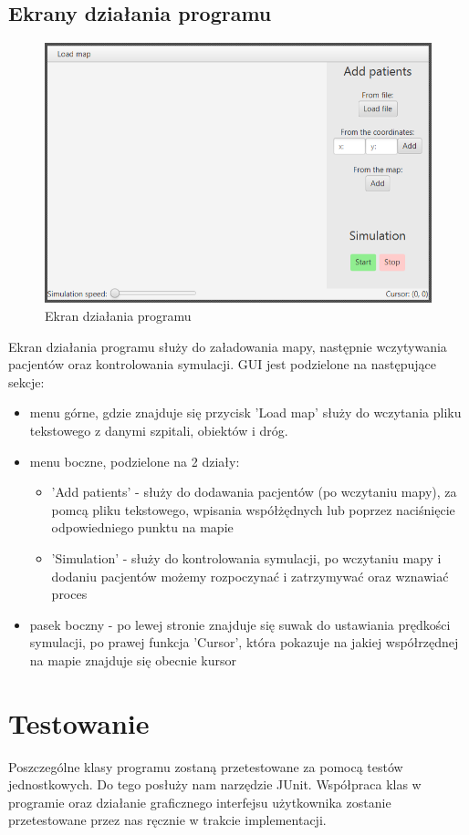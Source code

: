 \documentclass[]{article}
\begin{document}
    \subsection{Ekrany działania programu}
    \begin{figure}[!h]
    \centering
    \includegraphics[width=\textwidth]{gui.jpg}
    \caption{Ekran działania programu}
    \label{fig:Shrek}
    \end{figure}
    Ekran działania programu służy do załadowania mapy, następnie wczytywania pacjentów oraz kontrolowania symulacji. GUI jest podzielone na następujące sekcje:
    \begin{itemize}
    \item menu górne, gdzie znajduje się przycisk 'Load map' służy do wczytania pliku tekstowego z danymi szpitali, obiektów i dróg.
    \item menu boczne, podzielone na 2 działy: 
    \begin{itemize}
    \item 'Add patients' - służy do dodawania pacjentów (po wczytaniu mapy), za pomcą pliku tekstowego, wpisania współżędnych lub poprzez naciśnięcie odpowiedniego punktu na mapie
    \item 'Simulation' - służy do kontrolowania symulacji, po wczytaniu mapy i dodaniu pacjentów możemy rozpoczynać i zatrzymywać oraz wznawiać proces
    \end{itemize}
    \item pasek boczny - po lewej stronie znajduje się suwak do ustawiania prędkości symulacji, po prawej funkcja 'Cursor', która pokazuje na jakiej współrzędnej na mapie znajduje się obecnie kursor 
    \end{itemize}


    \section{Testowanie}
    Poszczególne klasy programu zostaną przetestowane za pomocą testów jednostkowych. Do tego posłuży nam narzędzie JUnit. Współpraca klas w programie oraz działanie graficznego interfejsu użytkownika zostanie przetestowane przez nas ręcznie w trakcie implementacji.
\end{document}

